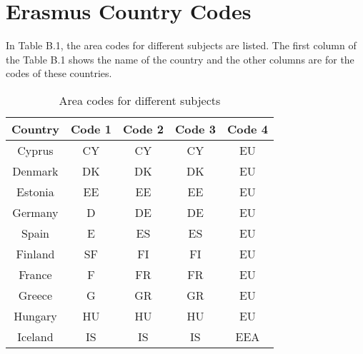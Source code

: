 \chapter{Erasmus Country Codes}
In Table B.1, the area codes for different subjects are listed. The first column of the Table B.1 shows the name of the country and the other columns are for the codes of these countries.  

\begin{table}[!ht]
\caption{Area codes for different subjects}
\centering
\begin{tabular}{|c|c|c|c|c|}
\hline
\textbf{Country} & \textbf{Code 1} & \textbf{Code 2} & \textbf{Code 3} & \textbf{Code 4}                                                     \\ \hline
Cyprus           & CY              & CY              & CY              & EU                                                                  \\ \hline
Denmark          & DK              & DK              & DK              & EU                                                                  \\ \hline
Estonia          & EE              & EE              & EE              & EU                                                                  \\ \hline
Germany          & D               & DE              & DE              & EU                                                                  \\ \hline
Spain            & E               & ES              & ES              & EU                                                                  \\ \hline
Finland          & SF              & FI              & FI              & EU                                                                  \\ \hline
France           & F               & FR              & FR              & EU                                                                  \\ \hline
Greece           & G               & GR              & GR              & EU                                                                  \\ \hline
Hungary          & HU              & HU              & HU              & EU                                                                  \\ \hline
Iceland          & IS              & IS              & IS              & EEA                                                                 \\ \hline

\end{tabular}
\end{table}
